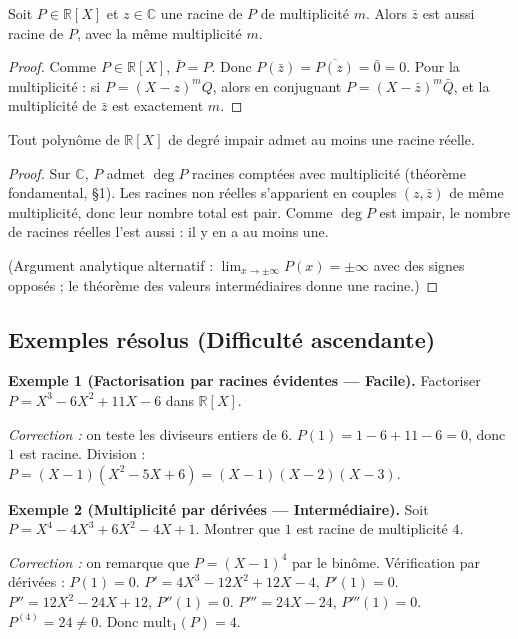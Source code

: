 \begin{theoreme}
Soit $P \in \mathbb{R}[X]$ et $z \in \mathbb{C}$ une racine de $P$ de multiplicité $m$. Alors $\bar{z}$ est aussi racine de $P$, avec la même multiplicité $m$.
\end{theoreme}

\begin{proof}
Comme $P \in \mathbb{R}[X]$, $\bar{P} = P$. Donc $P(\bar{z}) = \overline{P(z)} = \bar{0} = 0$. Pour la multiplicité : si $P = (X - z)^m Q$, alors en conjuguant $P = (X - \bar{z})^m \bar{Q}$, et la multiplicité de $\bar{z}$ est exactement $m$.
\end{proof}

\begin{corollaire}
Tout polynôme de $\mathbb{R}[X]$ de degré impair admet au moins une racine réelle.
\end{corollaire}

\begin{proof}
Sur $\mathbb{C}$, $P$ admet $\deg P$ racines comptées avec multiplicité (théorème fondamental, §1). Les racines non réelles s'apparient en couples $(z, \bar{z})$ de même multiplicité, donc leur nombre total est pair. Comme $\deg P$ est impair, le nombre de racines réelles l'est aussi : il y en a au moins une.

(Argument analytique alternatif : $\lim_{x \to \pm\infty} P(x) = \pm \infty$ avec des signes opposés ; le théorème des valeurs intermédiaires donne une racine.)
\end{proof}

\subsection{Exemples résolus (Difficulté ascendante)}

\textbf{Exemple 1 (Factorisation par racines évidentes --- Facile).}
Factoriser $P = X^3 - 6X^2 + 11X - 6$ dans $\mathbb{R}[X]$.

\textit{Correction :} on teste les diviseurs entiers de $6$. $P(1) = 1 - 6 + 11 - 6 = 0$, donc $1$ est racine. Division : $P = (X - 1)(X^2 - 5X + 6) = (X - 1)(X - 2)(X - 3)$.

\medskip

\textbf{Exemple 2 (Multiplicité par dérivées --- Intermédiaire).}
Soit $P = X^4 - 4X^3 + 6X^2 - 4X + 1$. Montrer que $1$ est racine de multiplicité $4$.

\textit{Correction :} on remarque que $P = (X - 1)^4$ par le binôme. Vérification par dérivées :
$P(1) = 0$. $P' = 4X^3 - 12X^2 + 12X - 4$, $P'(1) = 0$. $P'' = 12X^2 - 24X + 12$, $P''(1) = 0$. $P''' = 24X - 24$, $P'''(1) = 0$. $P^{(4)} = 24 \neq 0$. Donc $\mathrm{mult}_1(P) = 4$. \checkmark

